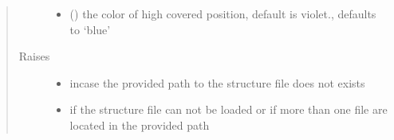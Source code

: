 \documentclass[letterpaper,10pt,english]{sphinxmanual}
\begin{document}
\begin{fulllineitems}
\begin{quote}
\begin{description}
\begin{itemize}
\item {} 
 (\sphinxstyleliteralemphasis{\sphinxupquote{, }}) \textendash{} the color of high covered position, default is violet., defaults to ‘blue’

\end{itemize}

\item[{Raises}] \leavevmode\begin{itemize}
\item {} 
 \textendash{} incase the provided path to the structure file does not exists

\item {} 
 \textendash{} if the structure file can not be loaded or if more than one file are located in the provided path

\end{itemize}

\end{description}\end{quote}

\end{fulllineitems}

\end{document}
